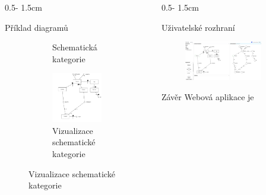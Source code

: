 \documentclass[a0paper]{uioposter}
\begin{document}
\begin{frame}
\begin{columns}[onlytextwidth]
\begin{column}{0.5\textwidth - 1.5cm}
\begin{block}{Příklad diagramů}
\begin{figure}
\begin{subfigure}{0.45\textwidth}
            \caption{Schematická kategorie}
          \end{subfigure}
          \begin{subfigure}{0.45\textwidth}
            \includegraphics[width=\textwidth]{./images/university-scv.pdf}
            \caption{Vizualizace schematické kategorie}
          \end{subfigure}
        \end{figure}
      \end{block}
    \end{column}


    \begin{column}{0.5\textwidth - 1.5cm}
      \begin{block}{Uživatelské rozhraní}
        \begin{figure}
          \centering
          \includegraphics[width=0.8\textwidth]{./images/identifier-screenshot.png}
        \end{figure}
      \end{block}
      \begin{block}{Závěr}
          Webová aplikace je 
      \end{block}
    \end{column}
  \end{columns}



\end{frame}
\end{document}
